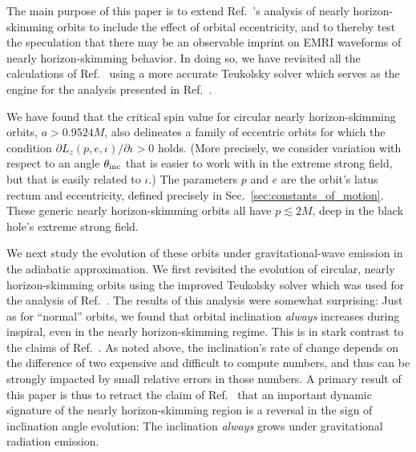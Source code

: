 \documentclass[aps,prd,twocolumn,showpacs,groupedaddress,nofootinbib]{revtex4}
\begin{document}
The main purpose of this paper is to extend Ref.\ \cite{skimming}'s
analysis of nearly horizon-skimming orbits to include the effect of
orbital eccentricity, and to thereby test the speculation that there
may be an observable imprint on EMRI waveforms of nearly
horizon-skimming behavior.  In doing so, we have revisited all the
calculations of Ref.\ {\cite{skimming}} using a more accurate
Teukolsky solver 
which serves as the engine for the analysis
presented in Ref.\ {\cite{hughes_drasco}}.

We have found that the critical spin value for circular nearly
horizon-skimming orbits, $a > 0.9524M$, also delineates a family of
eccentric orbits for which the condition $\partial
L_z(p,e,\iota)/\partial \iota > 0$ holds.  (More precisely, we
consider variation with respect to an angle $\theta_{\rm inc}$ that is
easier to work with in the extreme strong field, but that is easily
related to $\iota$.)  The parameters $p$ and $e$ are the orbit's latus
rectum and eccentricity, defined precisely in Sec.\
{\ref{sec:constants_of_motion}}.  These generic nearly
horizon-skimming orbits all have $p \lesssim 2M$, deep in the black
hole's extreme strong field.

We next study the evolution of these orbits under gravitational-wave
emission in the adiabatic approximation.  We first revisited the evolution of circular, nearly
horizon-skimming orbits using the improved Teukolsky solver which was
used for the analysis of Ref.\ {\cite{hughes_drasco}}.  The results of
this analysis were somewhat surprising: Just as for ``normal'' orbits,
we found that orbital inclination {\it always} increases during
inspiral, even in the nearly horizon-skimming regime.  This is in
stark contrast to the claims of Ref.\ {\cite{skimming}}.  As noted
above, the inclination's rate of change depends on the difference of
two expensive and difficult to compute numbers, and thus can be
strongly impacted by small relative errors in those numbers.  A
primary result of this paper is thus to retract the claim of Ref.\
{\cite{skimming}} that an important dynamic signature of the nearly
horizon-skimming region is a reversal in the sign of inclination angle
evolution: The inclination {\it always} grows under gravitational
radiation emission.
\end{document}
